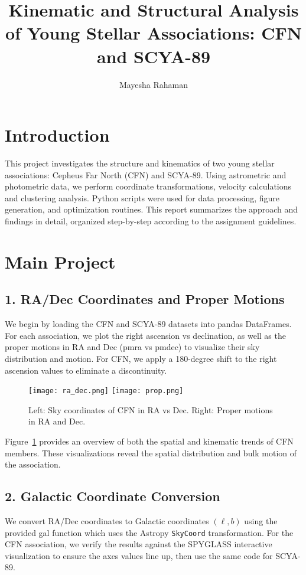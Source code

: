 \documentclass[11pt]{article}
\title{Kinematic and Structural Analysis of Young Stellar Associations: CFN and SCYA-89}
\author{Mayesha Rahaman}
\date{}
\begin{document}
\maketitle

\section*{Introduction}
This project investigates the structure and kinematics of two young stellar associations: Cepheus Far North (CFN) and SCYA-89. Using astrometric and photometric data, we perform coordinate transformations, velocity calculations and clustering analysis. Python scripts were used for data processing, figure generation, and optimization routines. This report summarizes the approach and findings in detail, organized step-by-step according to the assignment guidelines.

\section*{Main Project}

\subsection*{1. RA/Dec Coordinates and Proper Motions}
We begin by loading the CFN and SCYA-89 datasets into pandas DataFrames. For each association, we plot the right ascension vs declination, as well as the proper motions in RA and Dec (pmra vs pmdec) to visualize their sky distribution and motion. For CFN, we apply a 180-degree shift to the right ascension values to eliminate a discontinuity.

\begin{figure}[H]
    \centering
    \texttt{[image: ra\_dec.png]}
    \texttt{[image: prop.png]}
    \caption{Left: Sky coordinates of CFN in RA vs Dec. Right: Proper motions in RA and Dec.}
    \label{fig:radec_pm}
\end{figure}

Figure~\ref{fig:radec_pm} provides an overview of both the spatial and kinematic trends of CFN members. These visualizations reveal the spatial distribution and bulk motion of the association.


\subsection*{2. Galactic Coordinate Conversion}
We convert RA/Dec coordinates to Galactic coordinates $(\ell, b)$ using the provided gal function which uses the Astropy \texttt{SkyCoord} transformation. For the CFN association, we verify the results against the SPYGLASS interactive visualization to ensure the axes values line up, then use the same code for SCYA-89. 
\end{document}
